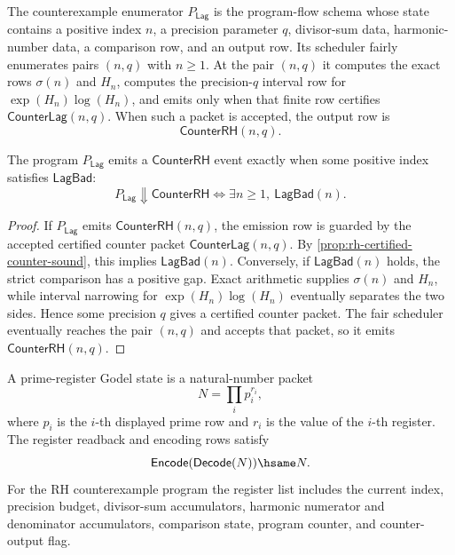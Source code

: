 \begin{definition}
\label{def:rh-counterexample-enumerator}
The counterexample enumerator $P_{\mathsf{Lag}}$ is the program-flow schema
whose state contains a positive index $n$, a precision parameter $q$,
divisor-sum data, harmonic-number data, a comparison row, and an output row.
Its scheduler fairly enumerates pairs $(n,q)$ with $n\geq 1$.  At the pair
$(n,q)$ it computes the exact rows $\sigma(n)$ and $H_n$, computes the
precision-$q$ interval row for $\exp(H_n)\log(H_n)$, and emits only when
that finite row certifies $\mathsf{CounterLag}(n,q)$.  When such a packet
is accepted, the output row is
$$
\mathsf{CounterRH}(n,q).
$$
\end{definition}

\begin{proposition}
\label{prop:rh-enumerator-output-criterion}
The program $P_{\mathsf{Lag}}$ emits a $\mathsf{CounterRH}$ event exactly
when some positive index satisfies $\mathsf{LagBad}$:
$$
P_{\mathsf{Lag}}\Downarrow\mathsf{CounterRH}
\Longleftrightarrow
\exists n\geq 1,\ \mathsf{LagBad}(n).
$$
\end{proposition}

\begin{proof}
If $P_{\mathsf{Lag}}$ emits $\mathsf{CounterRH}(n,q)$, the emission row is
guarded by the accepted certified counter packet
$\mathsf{CounterLag}(n,q)$.  By
\autoref{prop:rh-certified-counter-sound}, this implies
$\mathsf{LagBad}(n)$.  Conversely, if $\mathsf{LagBad}(n)$ holds, the
strict comparison has a positive gap.  Exact arithmetic supplies
$\sigma(n)$ and $H_n$, while interval narrowing for
$\exp(H_n)\log(H_n)$ eventually separates the two sides.  Hence some
precision $q$ gives a certified counter packet.  The fair scheduler
eventually reaches the pair $(n,q)$ and accepts that packet, so it emits
$\mathsf{CounterRH}(n,q)$.
\end{proof}

\begin{definition}
\label{def:rh-prime-register-godel-state}
A prime-register Godel state is a natural-number packet
$$
N=\prod_i p_i^{r_i},
$$
where $p_i$ is the $i$-th displayed prime row and $r_i$ is the value of the
$i$-th register.  The register readback and encoding rows satisfy
$$
\mathsf{Encode}(\mathsf{Decode}(N))\hsame N.
$$
For the RH counterexample program the register list includes the current
index, precision budget, divisor-sum accumulators, harmonic numerator and
denominator accumulators, comparison state, program counter, and
counter-output flag.
\end{definition}

